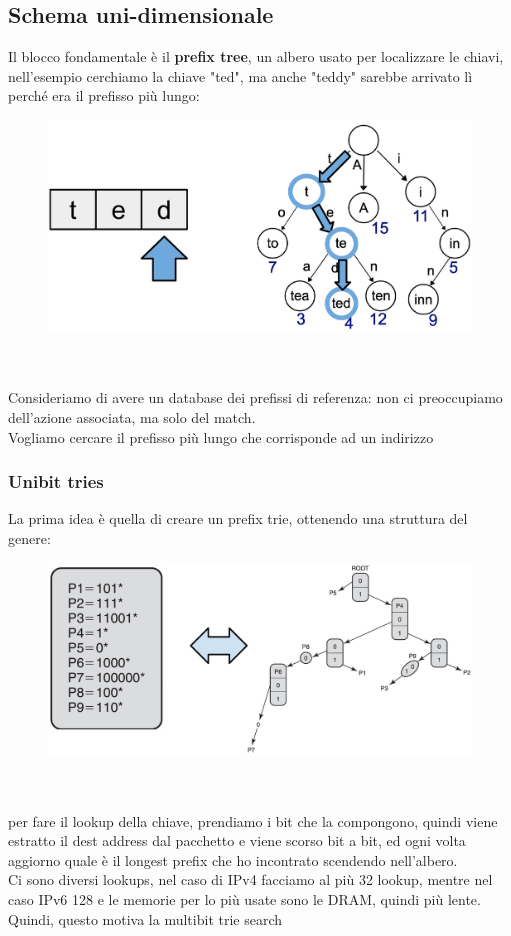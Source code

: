 \documentclass[12pt, oneside]{extbook} %
\begin{document}
\subsection{Schema uni-dimensionale}
Il blocco fondamentale è il \textbf{prefix tree}, un albero usato per localizzare le chiavi, nell'esempio cerchiamo la chiave "ted", ma anche "teddy" sarebbe arrivato lì perché era il prefisso più lungo:\\
\begin{figure}[h!]
    \centering
    \includegraphics[scale=0.5]{../../immagini/tries}
\end{figure}\\\\
Consideriamo di avere un database dei prefissi di referenza: non ci preoccupiamo dell'azione associata, ma solo del match.
\\Vogliamo cercare il prefisso più lungo che corrisponde ad un indirizzo

\subsubsection{Unibit tries}
La prima idea è quella di creare un prefix trie, ottenendo una struttura del genere:\\
\begin{figure}[h!]
    \centering
    \includegraphics[scale=0.5]{../../immagini/unibit_tries}
\end{figure}\\\\
per fare il lookup della chiave, prendiamo i bit che la compongono, quindi viene estratto il dest address dal pacchetto e viene scorso bit a bit, ed ogni volta aggiorno quale è il longest prefix che ho incontrato scendendo nell'albero.
\\Ci sono diversi lookups, nel caso di IPv4 facciamo al più 32 lookup, mentre nel caso IPv6 128 e le memorie per lo più usate sono le DRAM, quindi più lente.
\\Quindi, questo motiva la multibit trie search
\end{document}

